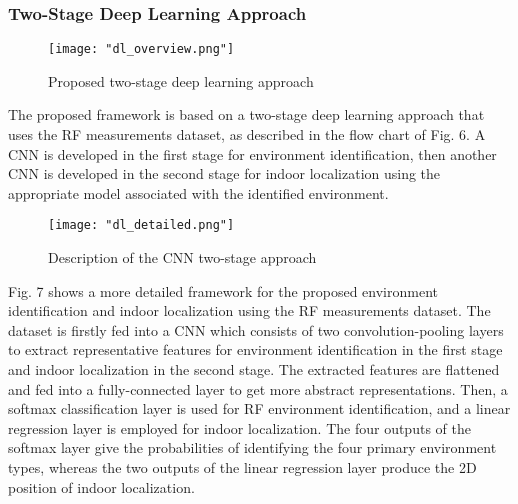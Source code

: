     \subsubsection{Two-Stage Deep Learning Approach}
    
    	\begin{figure}[H]
    		\captionsetup{justification=centering}
    		\texttt{[image: "dl\_overview.png"]}
    		\caption{Proposed two-stage deep learning approach \cite[Fig. 2]{dl}}
    	\end{figure}
    
    The proposed framework is based on a two-stage deep learning approach that uses the RF measurements dataset, as described in the flow chart of Fig. 6. A CNN is developed in the first stage for environment identification, then another CNN is developed in the second stage for indoor localization using the appropriate model associated with the identified environment. 
    
    	\begin{figure}[H]
    		\captionsetup{justification=centering}
    		\texttt{[image: "dl\_detailed.png"]}
    		\caption{Description of the CNN two-stage approach \cite[Fig. 3]{dl}}
    	\end{figure}
    
    Fig. 7 shows a more detailed framework for the proposed environment identification and indoor localization using the RF measurements dataset. The dataset is firstly fed into a CNN which consists of two convolution-pooling layers to extract representative features for environment identification in the first stage and indoor localization in the second stage. The extracted features are flattened and fed into a fully-connected layer to get more abstract representations. Then, a softmax classification layer is used for RF environment identification, and a linear regression layer is employed for indoor localization. The four outputs of the softmax layer give the probabilities of identifying the four primary environment types, whereas the two outputs of the linear regression layer produce the 2D position of indoor localization.